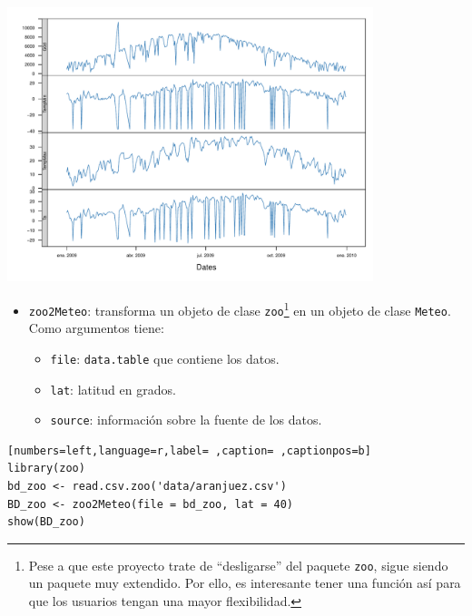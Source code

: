 \begin{center}
\includegraphics[width=0.8\textwidth]{figuras/codigo-dt2meteo.pdf}
\end{center}
\begin{itemize}
\item \texttt{zoo2Meteo}: transforma un objeto de clase \texttt{zoo}\footnote{Pese a que este proyecto trate de ``desligarse'' del paquete \texttt{zoo}, sigue siendo un paquete muy extendido. Por ello, es interesante tener una función así para que los usuarios tengan una mayor flexibilidad.} en un objeto de clase \texttt{Meteo}.
Como argumentos tiene:
\begin{itemize}
\item \texttt{file}: \texttt{data.table} que contiene los datos.
\item \texttt{lat}: latitud en grados.
\item \texttt{source}: información sobre la fuente de los datos.
\end{itemize}
\end{itemize}
\begin{lstlisting}[numbers=left,language=r,label= ,caption= ,captionpos=b]
library(zoo)
bd_zoo <- read.csv.zoo('data/aranjuez.csv')
BD_zoo <- zoo2Meteo(file = bd_zoo, lat = 40)
show(BD_zoo)
\end{lstlisting}

